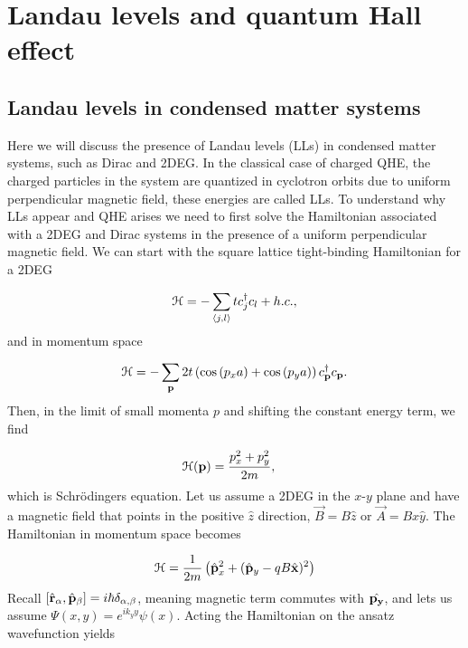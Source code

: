 \section{Landau levels and quantum Hall effect}

\subsection{Landau levels in condensed matter systems}
Here we will discuss the presence of Landau levels (LLs) in condensed matter systems, such as Dirac and 2DEG.
In the classical case of charged QHE, the charged particles in the system are quantized in cyclotron orbits due to uniform perpendicular magnetic field, these energies are called LLs.
To understand why LLs appear and QHE arises we need to first solve the Hamiltonian associated with a 2DEG and Dirac systems in the presence of a uniform perpendicular magnetic field.
We can start with the square lattice tight-binding Hamiltonian for a 2DEG

\begin{equation}
  \mathcal{H} = -\sum_{\langle j,l \rangle} tc^{\dagger}_j c_{l} + h.c.,
\end{equation}
and in momentum space

\begin{equation}
  \mathcal{H} = -\sum_{\mathbf{p}} 2t \left( \cos{(p_x a)} + \cos{(p_y a)} \right) c^{\dagger}_{\mathbf{p}} c_{\mathbf{p}}.
\end{equation}
Then, in the limit of small momenta $p$ and shifting the constant energy term, we find

\begin{align}
  \mathcal{H}(\mathbf{p}) &= \dfrac{p_x^2 + p_y^2}{2m},
\end{align}
which is Schr\"{o}dingers equation.
Let us assume a 2DEG in the $x$-$y$ plane and have a magnetic field that points in the positive $\hat{z}$ direction, $\vec{B} = B\hat{z}$ or $\vec{A} = Bx\hat{y}$.
The Hamiltonian in momentum space becomes

\begin{equation}
  \ham = \dfrac{1}{2m} \left( \op{p}_x^2 + (\op{p}_y - qB \op{x})^2 \right)
\end{equation}
Recall $[\op{r}_{\alpha}, \op{p}_{\beta}] = i\hbar \delta_{\alpha,\beta}$, meaning magnetic term commutes with $\op{p_y}$, and lets us assume $\Psi(x,y) = e^{ik_y y} \psi(x)$.
Acting the Hamiltonian on the ansatz wavefunction yields

